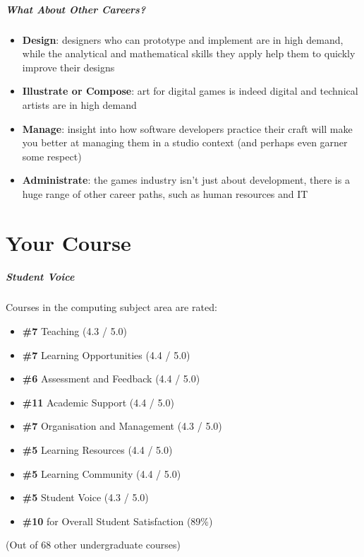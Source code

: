 \begin{frame}
	\frametitle{What About Other Careers?}
	
	\begin{itemize}
		\item 	\textbf{Design}: designers who can prototype and implement are in high demand, while the analytical and mathematical skills they apply help them to quickly improve their designs \pause
		\item 	\textbf{Illustrate or Compose}: art for digital games is indeed digital and technical artists are in high demand \pause
		\item 	\textbf{Manage}: insight into how software developers practice their craft will make you better at managing them in a studio context 
			(and perhaps even garner some respect) \pause
		\item 	\textbf{Administrate}: the games industry isn't just about development, there is a huge range of other career paths,
			such as human resources and IT
	\end{itemize}
\end{frame}


\part{Your Course}
\frame{\partpage}

\begin{frame}
	\frametitle{Student Voice}
	
	Courses in the computing subject area are rated:
	
	\begin{itemize}
		\item \textbf{\#7} Teaching (4.3 / 5.0)
		\item \textbf{\#7} Learning Opportunities (4.4 / 5.0)
		\item \textbf{\#6} Assessment and Feedback (4.4 / 5.0)
		\item \textbf{\#11} Academic Support (4.4 / 5.0)
		\item \textbf{\#7} Organisation and Management (4.3 / 5.0)
		\item \textbf{\#5} Learning Resources (4.4 / 5.0)
		\item \textbf{\#5} Learning Community (4.4 / 5.0)
		\item \textbf{\#5} Student Voice (4.3 / 5.0)
		\item \textbf{\#10} for Overall Student Satisfaction (89\%)
	\end{itemize}
	
	(Out of 68 other undergraduate courses)
	
\end{frame}

